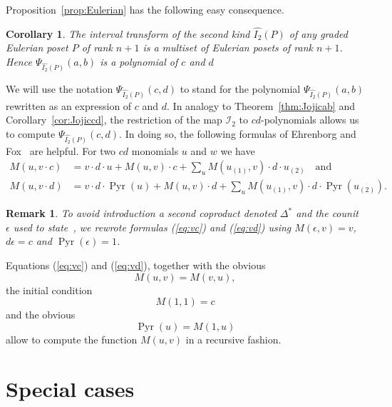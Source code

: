 \documentclass[reqno,12pt]{amsart}
\numberwithin{equation}{section}
\newtheorem{corollary}[theorem]{Corollary}
\newtheorem{remark}[theorem]{Remark}
\newcommand{\0}{\widehat{0}}
\newcommand{\1}{\widehat{1}}
\newcommand{\2}{\widehat{2}}
\newcommand{\grII}{\widehat{I_2}}
\newcommand{\IIab}{{\mathcal I}_2}
\begin{document}
Proposition~\ref{prop:Eulerian} has the following easy consequence.
\begin{corollary}
The interval transform of the second kind $\grII(P)$ of any graded
Eulerian poset $P$ of rank $n+1$ is a multiset of Eulerian posets of
rank $n+1$. Hence $\Psi_{\grII(P)}(a,b)$ is a polynomial of $c$ and $d$  
\end{corollary}  
We will use the notation $\Psi_{\grII(P)}(c,d)$ to stand for the
polynomial $\Psi_{\grII(P)}(a,b)$ rewritten as an expression of $c$ and
$d$. In analogy to Theorem~\ref{thm:Jojicab} and Corollary~\ref{cor:Jojiccd},
the restriction of the map $\IIab$ to $cd$-polynomials allows us to
compute $\Psi_{\grII(P)}(c,d)$. In doing so, the following formulas of
Ehrenborg and Fox~\cite[Theorem 5.1]{Ehrenborg-Fox} are helpful. For two
$cd$ monomials $u$ and $w$ we have
\begin{align}
\label{eq:vc}  
  M(u,v\cdot c)&=v\cdot d\cdot u+M(u,v)\cdot c+\sum_{u} M(u_{(1)},v)\cdot d
  \cdot u_{(2)}\quad\mbox{and}\\ 
\label{eq:vd}  
  M(u,v\cdot d)
  &=v\cdot d\cdot \operatorname{Pyr}(u)
  +M(u,v)\cdot d
  +\sum_{u} M(u_{(1)},v)\cdot d \cdot \operatorname{Pyr}(u_{(2)}).
\end{align}  
\begin{remark}
{\em To avoid introduction a second coproduct denoted $\Delta^*$ and the
counit $\epsilon$ used to state~\cite[Theorem 5.1]{Ehrenborg-Fox}, we
rewrote formulas (\ref{eq:vc})  and (\ref{eq:vd}) using
$M(\epsilon,v)=v$, $d\epsilon=c$ and $\operatorname{Pyr}(\epsilon)=1$.
}
\end{remark}  
Equations (\ref{eq:vc})  and (\ref{eq:vd}), together with the obvious
\begin{equation}
\label{eq:Mswap}  
M(u,v)=M(v,u),
\end{equation}
the initial condition
\begin{equation}
M(1,1)=c
\end{equation}
and the obvious
\begin{equation}
\operatorname{Pyr}(u)=M(1,u)
\end{equation}
allow to compute the function $M(u,v)$ in a recursive fashion.

\section{Special cases}
\label{sec:special}
\end{document}
